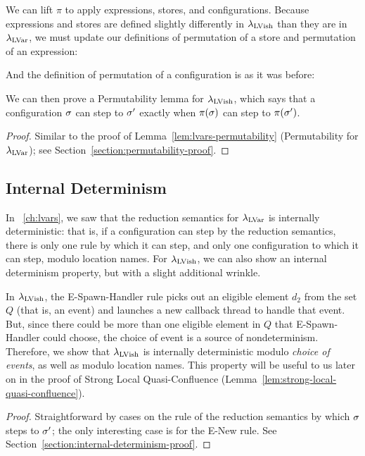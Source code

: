 \DefPermutation

We can lift $\pi$ to apply expressions, stores, and
configurations.
\ifdefined\DISSERTATION
Because expressions and stores are defined slightly
differently in $\lambda_{\textrm{LVish}}$ than they are in $\lambda_{\textrm{LVar}}$, we must
update our definitions of permutation of a store and permutation of an
expression:

\DefPermutationExpression

\DefPermutationStore

And the definition of permutation of a configuration is as it was before:

\DefPermutationConfiguration
\fi
We can then prove a Permutability lemma for $\lambda_{\textrm{LVish}}$, which says
that a configuration $\sigma$ can step to $\sigma'$ exactly when
$\pi(\sigma)$ can step to $\pi(\sigma')$.

\LemPermutability
\ifdefined\DISSERTATION
\begin{proof}
  Similar to the proof of Lemma~\ref{lem:lvars-permutability}
  (Permutability for $\lambda_{\textrm{LVar}}$); see
  Section~\ref{section:permutability-proof}.
\end{proof}
\fi

\subsection{Internal Determinism}

In ~\ref{ch:lvars}, we saw that the reduction
semantics for $\lambda_{\textrm{LVar}}$ is internally deterministic: that is, if a
configuration can step by the reduction semantics, there is only one
rule by which it can step, and only one configuration to which it can
step, modulo location names.  For $\lambda_{\textrm{LVish}}$, we can also show an
internal determinism property, but with a slight additional wrinkle.

In $\lambda_{\textrm{LVish}}$, the {\sc E-Spawn-Handler} rule picks out an
eligible element $d_2$ from the set $Q$ (that is, an event) and
launches a new callback thread to handle that event.  But, since there
could be more than one eligible element in $Q$ that {\sc
  E-Spawn-Handler} could choose, the choice of event is a source of
nondeterminism.  Therefore, we show that $\lambda_{\textrm{LVish}}$ is internally
deterministic modulo \emph{choice of events}, as well as modulo
location names.  This property will be useful to us later on in the
proof of Strong Local Quasi-Confluence
(Lemma~\ref{lem:strong-local-quasi-confluence}).

\LemInternalDeterminism
\ifdefined\DISSERTATION
\begin{proof}
  Straightforward by cases on the rule of the reduction semantics by
  which $\sigma$ steps to $\sigma'$; the only interesting case is for
  the {\sc E-New} rule.  See
  Section~\ref{section:internal-determinism-proof}.
\end{proof}
\fi

